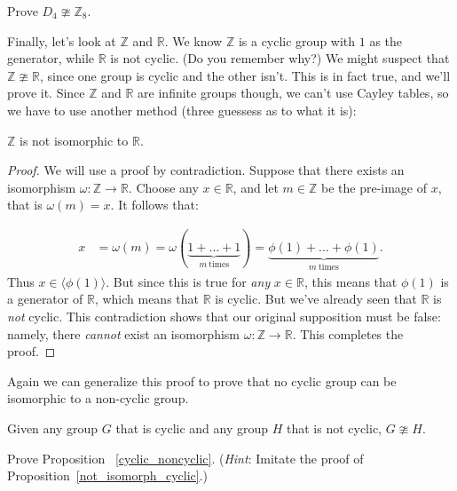 \begin{exercise}\label{exercise:isomorph:iso_prac7}
Prove $D_4 \ncong {\mathbb Z}_8$.
\end{exercise}


Finally, let's look at ${\mathbb Z}$ and ${\mathbb R}$.  We know ${\mathbb Z}$ is a cyclic group with $1$ as the generator, while ${\mathbb R}$ is not cyclic. (Do you remember why?)  We might suspect  that  ${\mathbb Z} \ncong {\mathbb R}$, since one group is cyclic and the other isn't.  This is in fact true, and we'll prove it.   Since ${\mathbb Z}$ and ${\mathbb R}$ are infinite groups though, we can't use Cayley tables, so we have to use another method (three guessess as to what it is):

\begin{thm}\label{not_isomorph_cyclic}
${\mathbb Z}$ is not isomorphic to ${\mathbb R}$.
\end{thm}
\begin{proof}
We will use a proof by contradiction.   Suppose that there exists an isomorphism $\omega: {\mathbb Z} \rightarrow {\mathbb R}$.  Choose any $x \in {\mathbb R}$, and let $m \in {\mathbb Z}$ be the pre-image of $x$, that is $\omega(m) = x$.  It follows that: 

\begin{align*}
x &= \omega(m) = \omega(\underbrace{1 + \ldots + 1}_{m~\textrm{times}})= \underbrace{\phi(1) + \ldots + \phi(1)}_{m~\textrm{times}}.
\end{align*}
Thus $x \in \langle  \phi(1) \rangle$.  But since this is true for \emph{any} $x \in {\mathbb R}$, this means that  $\phi(1)$ is a generator of  ${\mathbb R}$, which means that ${\mathbb R}$ is cyclic. But we've already seen that 
${\mathbb R}$ is \emph{not} cyclic. This contradiction shows that our original supposition must be false: namely, there \emph{cannot} exist an isomorphism $\omega: {\mathbb Z} \rightarrow {\mathbb R}$. This completes the proof.
\end{proof}

Again we can generalize this proof to prove that no cyclic group can be isomorphic to a non-cyclic group.

\begin{thm}\label{cyclic_noncyclic}
Given any group $G$ that is cyclic and any group $H$ that is not cyclic, $G \ncong H$.
\end{thm}

\begin{exercise}
Prove Proposition ~\ref{cyclic_noncyclic}. (\emph{Hint}: Imitate the proof of Proposition~\ref{not_isomorph_cyclic}.)
\end{exercise}

